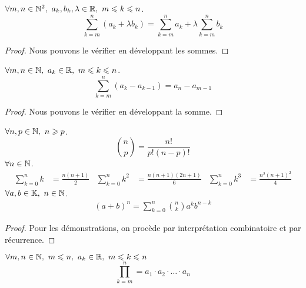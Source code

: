 \begin{proposition}
    $\forall m, n \in \mathbb{N}^2,\ a_k, b_k, \lambda \in \mathbb{R},\ m \leqslant k \leqslant n$.
    \[ \sum_{k = m}^{n} (a_k + \lambda b_k) = \sum_{k = m}^n a_k + \lambda \sum_{k = m}^n b_k \]
\end{proposition}

\begin{proof}
	Nous pouvons le vérifier en développant les sommes.
\end{proof}

\begin{proposition}
    $\forall m, n \in \mathbb{N},\ a_k \in \mathbb{R},\ m \leqslant k \leqslant n$.
    \[ \sum_{k = m}^n (a_k - a_{k - 1}) = a_n - a_{m - 1} \]
\end{proposition}

\begin{proof}
	Nous pouvons le vérifier en développant la somme.
\end{proof}

\begin{proposition}
	$\forall n, p \in \mathbb{N},\ n \geqslant p$.
	\[ \binom{n}{p} = \frac{n!}{p!(n - p)!} \]
	$\forall n \in \mathbb{N}$.
	\begin{align*}
		\sum_{k = 0}^{n} k &= \frac{n(n+1)}{2} & 
		\sum_{k = 0}^{n} k^2 &= \frac{n(n+1)(2n+1)}{6} &
		\sum_{k = 0}^{n} k^3 &= \frac{n^2(n+1)^2}{4}
	\end{align*}
	$\forall a, b \in \mathbb{K},\ n \in \mathbb{N}$.
	\begin{align*}
		(a + b)^n = \sum_{k = 0}^{n} \binom{n}{k} a^kb^{n-k}
	\end{align*}
\end{proposition}
\begin{proof}
    Pour les démonstrations, on procède par interprétation combinatoire et par récurrence.
\end{proof}

\begin{definition}[Produit]
    $\forall m, n \in \mathbb{N},\ m \leqslant n,\ a_k \in \mathbb{R},\ m \leqslant k \leqslant n$
    \[ \prod_{k = m}^{n} = a_1 \cdot a_2 \cdot \ldots \cdot a_n \]
\end{definition}